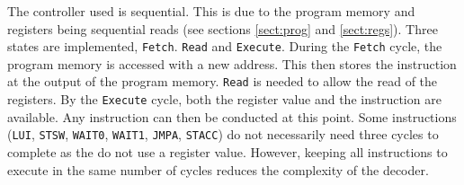 


The controller used is sequential. 
This is due to the program memory and registers being sequential reads (see sections \ref{sect:prog} and \ref{sect:regs}).
Three states are implemented, \texttt{Fetch}. \texttt{Read} and \texttt{Execute}. 
During the \texttt{Fetch} cycle, the program memory is accessed with a new address. 
This then stores the instruction at the output of the program memory. 
\texttt{Read} is needed to allow the read of the registers. 
By the \texttt{Execute} cycle, both the register value and the instruction are available. 
Any instruction can then be conducted at this point.
Some instructions (\texttt{LUI}, \texttt{STSW}, \texttt{WAIT0}, \texttt{WAIT1}, \texttt{JMPA}, \texttt{STACC}) do not necessarily need three cycles to complete as the do not use a register value.
However, keeping all instructions to execute in the same number of cycles reduces the complexity of the decoder. 


